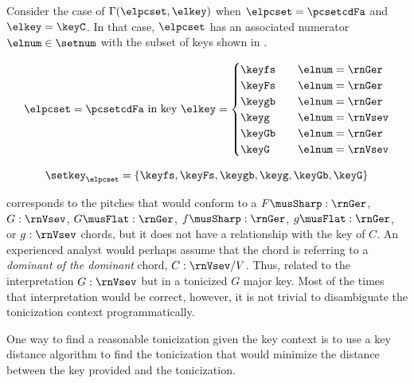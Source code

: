 
Consider the case of $\Gamma(\elpcset, \elkey)$ when
$\elpcset = \pcsetcdFa$ and $\elkey = \keyC$. In that case,
$\elpcset$ has an associated numerator $\elnum \in \setnum$
with the subset of keys shown in . 

\begin{equation}
    \label{eq:key_not_found}
    \elpcset = \pcsetcdFa \text{ in key } \elkey =
    \begin{cases}
        \keyfs & \quad \elnum = \rnGer \\
        \keyFs & \quad \elnum = \rnGer \\
        \keygb & \quad \elnum = \rnGer \\
        \keyg  & \quad \elnum = \rnVsev \\
        \keyGb & \quad \elnum = \rnGer \\
        \keyG  & \quad \elnum = \rnVsev \\
    \end{cases}
\end{equation}

\begin{equation}
    \setkey_\elpcset = \{ \keyfs, \keyFs, \keygb, \keyg, \keyGb, \keyG \}
\end{equation}

corresponds to the pitches that would conform to a
$F\musSharp:\rnGer$, $G:\rnVsev$, $G\musFlat:\rnGer$,
$f\musSharp:\rnGer$, $g\musFlat:\rnGer$, or $g:\rnVsev$
chords, but it does not have a relationship with the key of
$C$. An experienced analyst would perhaps assume that the
chord is referring to a \emph{dominant of the dominant}
chord, $C:\rnVsev/V$. Thus, related to the interpretation
$G:\rnVsev$ but in a tonicized $G$ major key. Most of the
times that interpretation would be correct, however, it is
not trivial to disambiguate the tonicization context
programmatically.

One way to find a reasonable tonicization given the key
context is to use a key distance algorithm to find the
tonicization that would minimize the distance between the
key provided and the tonicization.
